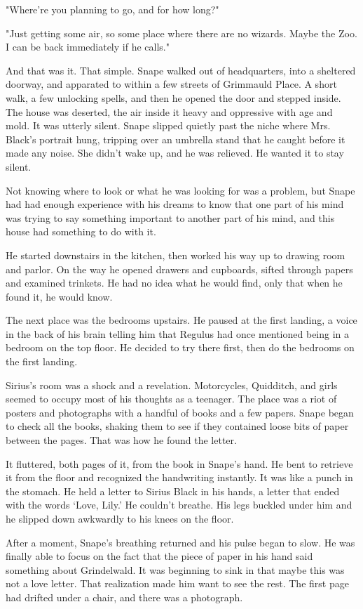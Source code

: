 \documentclass[a4paper,11pt]{article}
\begin{document}
"Where're you planning to go, and for how long?"

"Just getting some air, so some place where there are no wizards. Maybe the Zoo. I can be back immediately if he calls."

And that was it. That simple. Snape walked out of headquarters, into a sheltered doorway, and apparated to within a few streets of Grimmauld Place. A short walk, a few unlocking spells, and then he opened the door and stepped inside. The house was deserted, the air inside it heavy and oppressive with age and mold. It was utterly silent. Snape slipped quietly past the niche where Mrs. Black's portrait hung, tripping over an umbrella stand that he caught before it made any noise. She didn't wake up, and he was relieved. He wanted it to stay silent.

Not knowing where to look or what he was looking for was a problem, but Snape had had enough experience with his dreams to know that one part of his mind was trying to say something important to another part of his mind, and this house had something to do with it.

He started downstairs in the kitchen, then worked his way up to drawing room and parlor. On the way he opened drawers and cupboards, sifted through papers and examined trinkets. He had no idea what he would find, only that when he found it, he would know.

The next place was the bedrooms upstairs. He paused at the first landing, a voice in the back of his brain telling him that Regulus had once mentioned being in a bedroom on the top floor. He decided to try there first, then do the bedrooms on the first landing.

Sirius's room was a shock and a revelation. Motorcycles, Quidditch, and girls seemed to occupy most of his thoughts as a teenager. The place was a riot of posters and photographs with a handful of books and a few papers. Snape began to check all the books, shaking them to see if they contained loose bits of paper between the pages. That was how he found the letter.

It fluttered, both pages of it, from the book in Snape's hand. He bent to retrieve it from the floor and recognized the handwriting instantly. It was like a punch in the stomach. He held a letter to Sirius Black in his hands, a letter that ended with the words `Love, Lily.' He couldn't breathe. His legs buckled under him and he slipped down awkwardly to his knees on the floor.

After a moment, Snape's breathing returned and his pulse began to slow. He was finally able to focus on the fact that the piece of paper in his hand said something about Grindelwald. It was beginning to sink in that maybe this was not a love letter. That realization made him want to see the rest. The first page had drifted under a chair, and there was a photograph.
\end{document}
